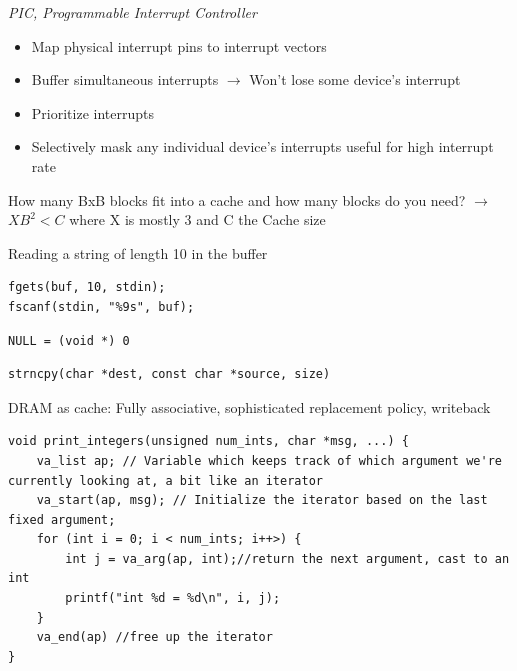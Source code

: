 \documentclass{article}
\begin{document}
\textit{PIC, Programmable Interrupt Controller}
\begin{itemize}
    \item Map physical interrupt pins to interrupt vectors
    \item Buffer simultaneous interrupts $\rightarrow$ Won't lose some device's interrupt
    \item Prioritize interrupts
    \item Selectively mask any individual device's interrupts useful for high interrupt rate
\end{itemize}

How many BxB blocks fit into a cache and how many blocks do you need? $\rightarrow$ $X B^2 < C$ where X is mostly 3 and C the Cache size

Reading a string of length 10 in the buffer
\begin{verbatim}
fgets(buf, 10, stdin);
fscanf(stdin, "%9s", buf);
\end{verbatim}

\begin{verbatim}
NULL = (void *) 0
\end{verbatim}

\begin{verbatim}
strncpy(char *dest, const char *source, size)
\end{verbatim}

DRAM as cache: Fully associative, sophisticated replacement policy, writeback

\begin{verbatim}
void print_integers(unsigned num_ints, char *msg, ...) {
    va_list ap; // Variable which keeps track of which argument we're currently looking at, a bit like an iterator
    va_start(ap, msg); // Initialize the iterator based on the last fixed argument;
    for (int i = 0; i < num_ints; i++>) {
        int j = va_arg(ap, int);//return the next argument, cast to an int
        printf("int %d = %d\n", i, j);
    }
    va_end(ap) //free up the iterator
}
\end{verbatim}
\end{document}
